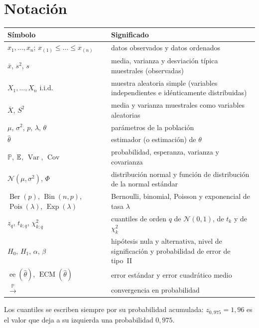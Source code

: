 \documentclass[11pt,a4paper,twoside,openany]{book}
\newcommand{\PP}{\mathbb{P}}
\DeclareMathOperator{\Var}{Var}
\DeclareMathOperator{\Cov}{Cov}
\DeclareMathOperator{\ECM}{ECM}
\DeclareMathOperator{\ee}{ee}
\DeclareMathOperator{\Bin}{Bin}
\DeclareMathOperator{\Ber}{Ber}
\DeclareMathOperator{\Pois}{Pois}
\DeclareMathOperator{\Expo}{Exp}
\newcommand{\Nor}{\mathcal{N}}
\newcommand{\Xbar}{\overline{X}}
\newcommand{\xbar}{\bar{x}}
\newcommand{\iid}{i.i.d.}
\newcommand{\convp}{\xrightarrow{\;\PP\;}}
\begin{document}
\section*{Notación}
\begin{center}
\small
\begin{tabularx}{\textwidth}{@{}>{\raggedright\arraybackslash}p{5.2cm}X@{}}
\toprule
Símbolo & Significado \\
\midrule
$x_1,\dots,x_n$; $x_{(1)}\le\dots\le x_{(n)}$ & datos observados y datos ordenados \\
$\xbar$, $s^{2}$, $s$ & media, varianza y desviación típica muestrales (observadas) \\
$X_1,\dots,X_n$ \iid & muestra aleatoria simple (variables independientes e idénticamente distribuidas) \\
$\Xbar$, $S^{2}$ & media y varianza muestrales como variables aleatorias \\
$\mu$, $\sigma^{2}$, $p$, $\lambda$, $\theta$ & parámetros de la población \\
$\widehat\theta$ & estimador (o estimación) de $\theta$ \\
$\PP$, $\mathbb{E}$, $\Var$, $\Cov$ & probabilidad, esperanza, varianza y covarianza \\
$\Nor(\mu,\sigma^{2})$, $\Phi$ & distribución normal y función de distribución de la normal estándar \\
$\Ber(p)$, $\Bin(n,p)$, $\Pois(\lambda)$, $\Expo(\lambda)$ & Bernoulli, binomial, Poisson y exponencial de tasa $\lambda$ \\
$z_{q}$, $t_{k;q}$, $\chi^{2}_{k;q}$ & cuantiles de orden $q$ de $\Nor(0,1)$, de $t_k$ y de $\chi^{2}_k$ \\
$H_0$, $H_1$, $\alpha$, $\beta$ & hipótesis nula y alternativa, nivel de significación y probabilidad de error de tipo~II \\
$\ee(\widehat\theta)$, $\ECM(\widehat\theta)$ & error estándar y error cuadrático medio \\
$\convp$ & convergencia en probabilidad \\
\bottomrule
\end{tabularx}
\end{center}
Los cuantiles se escriben siempre por su probabilidad acumulada: $z_{0{,}975}=1{,}96$ es el valor que deja a su izquierda una probabilidad $0{,}975$.

\tableofcontents

\mainmatter







\appendix



\backmatter

\end{document}
